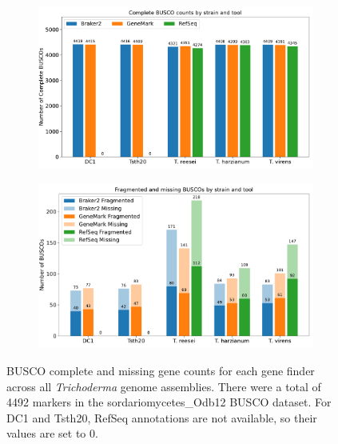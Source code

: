 \begin{figure}
  \centering
  \begin{subfigure}{0.9\textwidth}
    \centering
    \includegraphics[width=\textwidth]{figures/busco-complete-counts.pdf}
  \end{subfigure}
  \hfill
  \begin{subfigure}{0.9\textwidth}
    \centering
    \includegraphics[width=\textwidth]{figures/busco-missing-counts.pdf}
  \end{subfigure}
  \caption[BUSCO counts]{BUSCO complete and missing gene counts for each gene finder across all \textit{Trichoderma} genome assemblies. There were a total of 4492 markers in the sordariomycetes\_Odb12 BUSCO dataset. For DC1 and Tsth20, RefSeq annotations are not available, so their values are set to 0.}\label{fig:busco-counts}
\end{figure}

